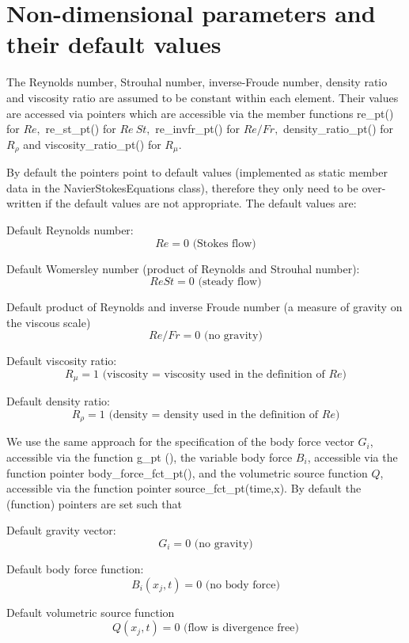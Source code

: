 \hypertarget{index_params}{}\section{Non-\/dimensional parameters and their default values}\label{index_params}
The Reynolds number, Strouhal number, inverse-\/\+Froude number, density ratio and viscosity ratio are assumed to be constant within each element. Their values are accessed via pointers which are accessible via the member functions {\ttfamily re\+\_\+pt()} for $ Re, $ {\ttfamily re\+\_\+st\+\_\+pt()} for $ Re \ St, $ {\ttfamily re\+\_\+invfr\+\_\+pt()} for $ Re/Fr, $ {\ttfamily density\+\_\+ratio\+\_\+pt()} for $ R_\rho $ and {\ttfamily viscosity\+\_\+ratio\+\_\+pt()} for $ R_\mu $.

By default the pointers point to default values (implemented as static member data in the {\ttfamily Navier\+Stokes\+Equations} class), therefore they only need to be over-\/written if the default values are not appropriate. The default values are\+:
\begin{DoxyItemize}
\item Default Reynolds number\+: \[ Re = 0 \mbox{\ \ \ \ (Stokes flow)} \]
\item Default Womersley number (product of Reynolds and Strouhal number)\+: \[ Re St = 0 \mbox{\ \ \ \ (steady flow)} \]
\item Default product of Reynolds and inverse Froude number (a measure of gravity on the viscous scale) \[ Re/Fr = 0 \mbox{\ \ \ \ (no gravity)} \]
\item Default viscosity ratio\+: \[ R_\mu = 1 \mbox{\ \ \ \ (viscosity = viscosity used in the definition of $Re$)} \]
\item Default density ratio\+: \[ R_\rho = 1 \mbox{\ \ \ \ (density = density used in the definition of $Re$)} \]
\end{DoxyItemize}We use the same approach for the specification of the body force vector $ G_i $, accessible via the function {\ttfamily g\+\_\+pt} (), the variable body force $ B_i $, accessible via the function pointer {\ttfamily body\+\_\+force\+\_\+fct\+\_\+pt()}, and the volumetric source function $ Q $, accessible via the function pointer {\ttfamily source\+\_\+fct\+\_\+pt(time,x)}. By default the (function) pointers are set such that
\begin{DoxyItemize}
\item Default gravity vector\+: \[ G_i = 0 \mbox{\ \ \ \ (no gravity)} \]
\item Default body force function\+: \[ B_i(x_j,t) = 0 \mbox{\ \ \ \ (no body force)} \]
\item Default volumetric source function \[ Q(x_j,t) = 0 \mbox{\ \ \ \ (flow is divergence free)} \]
\end{DoxyItemize}

